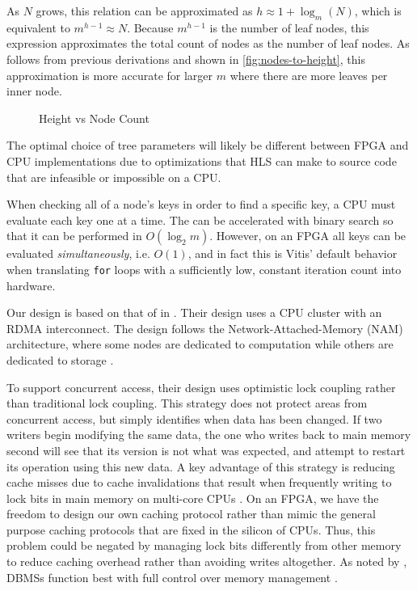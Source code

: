 As $N$ grows, this relation can be approximated as $h \approx 1 + \log_m(N)$,
which is equivalent to  $m^{h-1} \approx N$. Because $m^{h-1}$ is the number of
leaf nodes, this expression approximates the total count of nodes as the number
of leaf nodes. As follows from previous derivations and shown in
\autoref{fig:nodes-to-height}, this approximation is more accurate for larger $m$
where there are more leaves per inner node.

\begin{figure}
	\centering
	
	\caption{Height vs Node Count}
	\label{fig:nodes-to-height}
\end{figure}



The optimal choice of tree parameters will likely be different between FPGA and
CPU implementations due to optimizations that HLS can make to source code that
are infeasible or impossible on a CPU.

When checking all of a node's keys in order to find a specific key, a CPU must
evaluate each key one at a time. The can be accelerated with binary search so
that it can be performed in $O(\log_2 m)$. However, on an FPGA all keys can be
evaluated \emph{simultaneously}, i.e. $O(1)$, and in fact this is Vitis' default
behavior when translating \texttt{for} loops with a sufficiently low, constant
iteration count into hardware.


\label{subsec:concurrency}

Our design is based on that of \citeauthor{base} in . Their
design uses a CPU cluster with an RDMA interconnect. The design follows the
Network-Attached-Memory (NAM) architecture, where some nodes are dedicated to
computation while others are dedicated to storage
\autocite{base,binnig-vldb-2016}.

To support concurrent access, their design uses optimistic lock coupling rather
than traditional lock coupling. This strategy does not protect areas from
concurrent access, but simply identifies when data has been changed. If two
writers begin modifying the same data, the one who writes back to main memory
second will see that its version is not what was expected, and attempt to
restart its operation using this new data. A key advantage of this strategy is
reducing cache misses due to cache invalidations that result when frequently
writing to lock bits in main memory on multi-core CPUs
\autocite{leis-damon-2016}. On an FPGA, we have the freedom to design our own
caching protocol rather than mimic the general purpose caching protocols that
are fixed in the silicon of CPUs. Thus, this problem could be negated by
managing lock bits differently from other memory to reduce caching overhead
rather than avoiding writes altogether. As noted by
\citeauthor{binnig-vldb-2016}, DBMSs function best with full control over memory
management \autocite{binnig-vldb-2016}.


